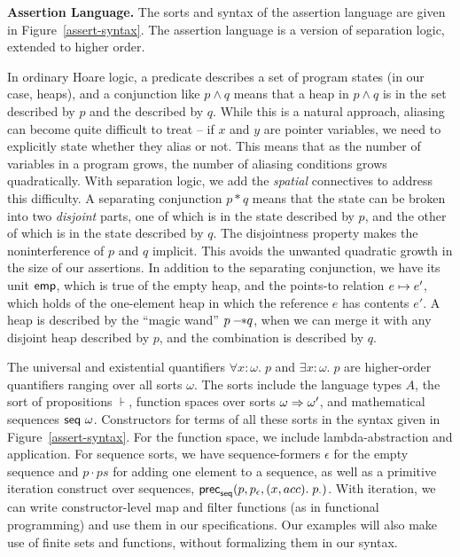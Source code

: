 \documentclass[preprint,natbib]{sigplanconf}
\begin{document}
\textbf{Assertion Language.} The sorts and syntax of the assertion
language are given in Figure~\ref{assert-syntax}. The assertion
language is a version of separation logic, extended to higher order.

In ordinary Hoare logic, a predicate describes a set of program states
(in our case, heaps), and a conjunction like $p \land q$ means that a
heap in $p \land q$ is in the set described by $p$ and the described
by $q$. While this is a natural approach, aliasing can become quite
difficult to treat -- if $x$ and $y$ are pointer variables, we need to
explicitly state whether they alias or not. This means that as the
number of variables in a program grows, the number of aliasing
conditions grows quadratically. 
With separation logic, we add the \emph{spatial} connectives to
address this difficulty. A separating conjunction $p * q$ means that
the state can be broken into two \emph{disjoint} parts, one of which
is in the state described by $p$, and the other of which is in the
state described by $q$. The disjointness property makes the
noninterference of $p$ and $q$ implicit. This avoids the unwanted
quadratic growth in the size of our assertions. In addition to the
separating conjunction, we have its unit $\mathsf{emp}$, which is true of the
empty heap, and the points-to relation $e \mapsto e'$, which holds
of the one-element heap in which the reference $e$ has contents
$e'$. A heap is described by the ``magic wand'' $p -\!\!* q$, when we
can merge it with any disjoint heap described by $p$, and the
combination is described by $q$.

The universal and existential quantifiers $\forall x:\omega.\;p$ and
$\exists x:\omega.\;p$ are higher-order quantifiers ranging over all
sorts $\omega$. The sorts include the language types $A$, the sort of
propositions $\assert$, function spaces over sorts $\omega \Rightarrow
\omega'$, and mathematical sequences $\mbox{\textsf{{seq }}}{\omega}$. Constructors
for terms of all these sorts in the syntax given in
Figure~\ref{assert-syntax}. For the function space, we include
lambda-abstraction and application. For sequence sorts, we have
sequence-formers $\epsilon$ for the empty sequence and $p \cdot ps$
for adding one element to a sequence, as well as a primitive iteration
construct over sequences,
$\mbox{\textsf{{prec}}}_{\mathsf{seq}}(p, {p_\epsilon}, (x,acc).\; {p_\cdot})$. With iteration, we can
write constructor-level map and filter functions (as in functional
programming) and use them in our specifications. Our examples will
also make use of finite sets and functions, without formalizing them
in our syntax.
\end{document}
